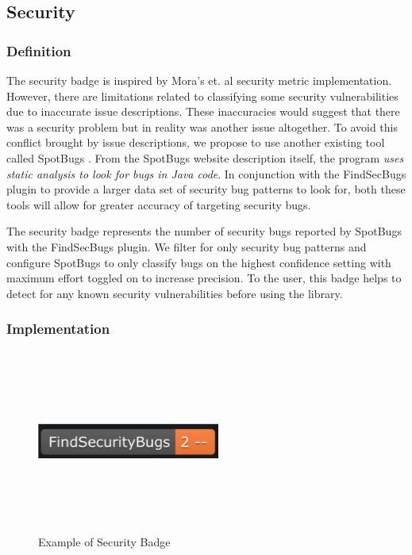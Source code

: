 \documentclass[12pt, letterpaper]{article}
\begin{document}
\subsection{Security}
\subsubsection{Definition}
The security badge is inspired by Mora's et. al \cite{metrics} security metric implementation.
However, there are limitations related to classifying some security vulnerabilities due to inaccurate
issue descriptions. These inaccuracies would suggest that there was a security problem but in reality was another issue altogether.
To avoid this conflict brought by issue descriptions, 
we propose to use another existing tool called SpotBugs \cite{spotbugs}.
From the SpotBugs \cite{spotbugs} website description itself, the program \textit{uses static analysis to look for bugs in Java code}.
In conjunction with the FindSecBugs \cite{findsecbugs} plugin to provide a larger data set of security bug patterns to look for, 
both these tools will allow for greater accuracy of targeting security bugs.

The security badge represents the number of security bugs reported by SpotBugs \cite{spotbugs} with the FindSecBugs \cite{findsecbugs} plugin.
We filter for only security bug patterns and configure SpotBugs to only classify bugs on the highest confidence setting
with maximum effort toggled on to increase precision. To the user, this badge helps to detect
for any known security vulnerabilities before using the library. 

\subsubsection{Implementation}

\begin{figure}[!htb]
    \centerline{
        \includegraphics[width=6cm,height=6cm,keepaspectratio=true]{findsecbugsbadge}
    }
    \caption{
        Example of Security Badge
    }
    \label{findsecbugsbadge}
\end{figure}
\end{document}
